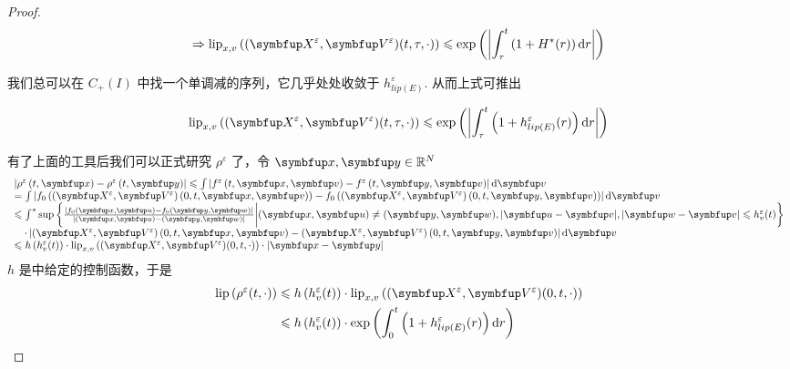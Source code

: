 \begin{proof}
\[
\Rightarrow \operatorname{lip}_{x,v}\left((\vect{X}^{\varepsilon},\vect{V}^{\varepsilon})(t, \tau, \cdot)\right) \leqslant \exp \left(\left|\int_{\tau}^{t}\left(1+H^{*}(r)\right) \mathrm{d} r\right|\right)
\]

我们总可以在 $C_{+}(I)$ 中找一个单调减的序列，它几乎处处收敛于 $h^{\varepsilon}_{lip(E)}$. 从而上式可推出 %

\begin{equation}
    \label{eq:lip-xv-XV}
    \operatorname{lip}_{x,v}\left((\vect{X}^{\varepsilon},\vect{V}^{\varepsilon})(t, \tau, \cdot)\right) \leqslant \exp \left(\left|\int_{\tau}^{t}\left(1+h^{\varepsilon}_{lip(E)}(r)\right) \mathrm{d} r\right|\right)
\end{equation}


有了上面的工具后我们可以正式研究 $\rho^\varepsilon$ 了，令 $\vx, \vy \in \mathbb{R}^{N}$
\[
\begin{array}{l}
\left|\rho^{\varepsilon}\left(t, \vx\right)-\rho^{\varepsilon}\left(t, \vy\right)\right| \leqslant \int\left|f^{\varepsilon}\left(t, \vx, \vv\right)-f^{\varepsilon}\left(t, \vy, \vv\right)\right| \mathrm{d} \vv \\
=\int\left|f_{0}\left((\vect{X}^{\varepsilon},\vect{V}^{\varepsilon})\left(0, t, \vx, \vv\right)\right)-f_{0}\left((\vect{X}^{\varepsilon},\vect{V}^{\varepsilon})\left(0, t, \vy, \vv\right)\right)\right| \mathrm{d} \vv \\
\leqslant \int^* \sup \left\{ \frac{|f_{0}(\vx, \vect{u})-f_{0}(\vy, \vect{w})|}{|(\vx, \vect{u})-(\vy, \vect{w})|} \bigg|(\vx,\vect{u}) \neq (\vy,\vect{w}),| \vect{u}-\vv|,| \vect{w}-\vv | \leqslant h_{v}^{\varepsilon}(t)\right\} \\
\quad \cdot\left|(\vect{X}^{\varepsilon},\vect{V}^{\varepsilon})\left(0, t, \vx, \vv\right)-(\vect{X}^{\varepsilon},\vect{V}^{\varepsilon})\left(0, t, \vy, \vv\right)\right| \mathrm{d} \vv \\
\leqslant h\left(h_{v}^{\varepsilon}(t)\right) \cdot\operatorname{lip}_{x,v}\left((\vect{X}^{\varepsilon},\vect{V}^{\varepsilon})(0, t, \cdot)\right) \cdot\left|\vx-\vy\right|
\end{array}
\]
$h$ 是\lipOffVsphere 中给定的控制函数，于是
\[
\begin{aligned}
\operatorname{lip}\left(\rho^{\varepsilon}(t, \cdot)\right) & \leqslant h\left(h_{v}^{\varepsilon}(t)\right) \cdot \operatorname{lip}_{x,v}\left((\vect{X}^{\varepsilon},\vect{V}^{\varepsilon})(0, t, \cdot)\right)  \\
& \leqslant h\left(h_{v}^{\varepsilon}(t)\right) \cdot \exp \left(\int_{0}^{t}\left(1+h^{\varepsilon}_{lip(E)}(r)\right) \mathrm{d} r\right)
\end{aligned}
\]



\end{proof}
